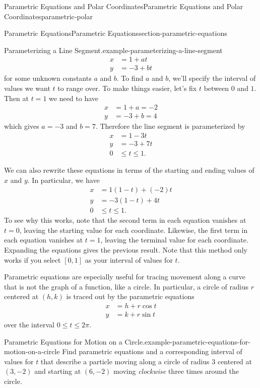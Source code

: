 \documentclass[oneside,10pt,]{book}
\numberwithin{equation}{section}
\newcommand{\amp}{&}
\begin{document}
\begin{chapterptx}{Parametric Equations and Polar Coordinates}{}{Parametric Equations and Polar Coordinates}{}{}{parametric-polar}
\begin{sectionptx}{Parametric Equations}{}{Parametric Equations}{}{}{section-parametric-equations}
\begin{example}{Parameterizing a Line Segment.}{example-parameterizing-a-line-segment}
\begin{align*}
x \amp = 1 + at \\
y \amp = -3 + bt 
\end{align*}
for some unknown constants \(a\) and \(b\). To find \(a\) and \(b\), we'll specify the interval of values we want \(t\) to range over. To make things easier, let's fix \(t\) between \(0\) and \(1\). Then at \(t = 1\) we need to have%
\begin{align*}
x \amp = 1 + a = -2 \\
y \amp = -3 + b = 4 
\end{align*}
which gives \(a = -3\) and \(b = 7\). Therefore the line segment is parameterized by%
\begin{align*}
x \amp = 1 - 3t \\
y \amp = -3 + 7t \\
0 \amp \leq t\leq 1 \text{.}
\end{align*}
%
\par
\hypertarget{p-998}{}%
We can also rewrite these equations in terms of the starting and ending values of \(x\) and \(y\). In particular, we have%
\begin{align*}
x \amp = 1(1 - t) + (-2)t \\
y \amp = -3(1 - t) + 4t \\
0 \amp \leq t\leq 1 \text{.}
\end{align*}
To see why this works, note that the second term in each equation vanishes at \(t = 0\), leaving the starting value for each coordinate. Likewise, the first term in each equation vanishes at \(t = 1\), leaving the terminal value for each coordinate. Expanding the equations gives the previous result. Note that this method only works if you select \([0,1]\) as your interval of values for \(t\).%
\end{example}
\hypertarget{p-999}{}%
Parametric equations are especially useful for tracing movement along a curve that is not the graph of a function, like a circle. In particular, a circle of radius \(r\) centered at \((h,k)\) is traced out by the parametric equations%
\begin{align*}
x \amp = h + r\cos t \\
y \amp = k + r\sin t 
\end{align*}
over the interval \(0\leq t\leq 2\pi\).%
\begin{example}{Parametric Equations for Motion on a Circle.}{example-parametric-equations-for-motion-on-a-circle}%
\hypertarget{p-1000}{}%
Find parametric equations and a corresponding interval of values for \(t\) that describe a particle moving along a circle of radius \(3\) centered at \((3,-2)\) and starting at \((6,-2)\) moving \emph{clockwise} three times around the circle.%

\end{example}
\end{sectionptx}
\end{chapterptx}
\end{document}
